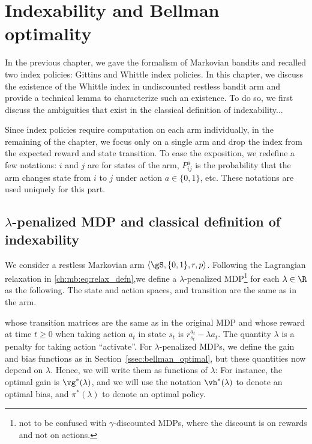 \begingroup

\let\clearpage\relax

\chapter{Indexability and Bellman optimality }
\label{ch:indexability}

In the previous chapter, we gave the formalism of Markovian bandits and recalled two index policies: Gittins and Whittle index policies.
In this chapter, we discuss the existence of the Whittle index in undiscounted restless bandit arm and provide a technical lemma to characterize such an existence.
To do so, we first discuss the ambiguities that exist in the classical definition of indexability...

Since index policies require computation on each arm individually,  in the remaining of the chapter, we focus only on a single arm and drop the index from the expected reward and state transition.
To ease the exposition, we redefine a few notations: $i$ and $j$ are for states of the arm, $P^a_{ij}$ is the probability that the arm changes state from $i$ to $j$ under action $a\in\{0,1\}$, etc.
These notations are used uniquely for this part.

\section{\texorpdfstring{$\lambda$-p}{P}enalized MDP and classical definition of indexability}
\label{sec:penal_mdp}

We consider a restless Markovian arm $\langle\gS,\{0,1\},r,p\rangle$.
Following the Lagrangian relaxation in \eqref{ch:mb:eq:relax_defn},we define a $\lambda$-penalized MDP\footnote{not to be confused with $\gamma$-discounted MDPs, where the discount is on rewards and not on actions.} for each $\lambda\in\R$ as the following.
The state and action spaces, and transition are the same as in the arm.

whose transition matrices are the same as in the original MDP and whose reward at time $t\ge0$ when taking action $a_t$ in state $s_t$ is $r^{a_t}_{s_t} - \lambda a_t$. The quantity $\lambda$ is a penalty for taking action ``activate''. For $\lambda$-penalized MDPs, we define the gain and bias functions as in Section~\ref{ssec:bellman_optimal}, but these quantities now depend on $\lambda$. Hence, we will write them as functions of $\lambda$: For instance, the optimal gain is $\vg^*(\lambda)$, and we will use the notation $\vh^*(\lambda)$ to denote an optimal bias, and $\pi^*(\lambda)$ to denote an optimal policy.


